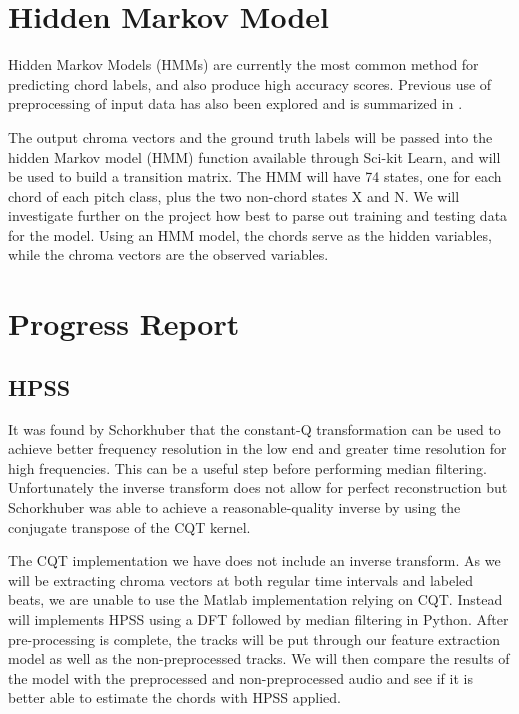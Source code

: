 \documentclass{article}
\begin{document}
\section{Hidden Markov Model}

Hidden Markov Models (HMMs) are currently the most common method for predicting
chord labels, and also produce high accuracy scores. Previous use of
preprocessing of input data has also been explored and is summarized in
\cite{McVicar:00}.

The output chroma vectors and the ground truth labels will be passed into the
hidden Markov model (HMM) function available through Sci-kit Learn, and will be used
to build a transition matrix. The HMM will have 74 states, one for each chord
of each pitch class, plus the two non-chord states X and N. We will investigate
further on the project how best to parse out training and testing data for the
model. Using an HMM model, the chords serve as the hidden variables, while the chroma 
vectors are the observed variables.

\section{Progress Report}\label{sec:progreport}

\subsection{HPSS}
It was found by Schorkhuber \cite{Schorkhuber:21} that the constant-Q
transformation can be used to achieve better frequency resolution in the low
end and greater time resolution for high frequencies. This can be a useful step
before performing median filtering. Unfortunately the inverse transform does
not allow for perfect reconstruction but Schorkhuber was able to achieve a
reasonable-quality inverse by using the conjugate transpose of the CQT kernel.

The CQT implementation we have does not include an inverse transform. As we
will be extracting chroma vectors at both regular time intervals and labeled beats, we
are unable to use the Matlab implementation relying on CQT.  Instead will
implements HPSS using a DFT followed by median filtering in Python. After
pre-processing is complete, the tracks will be put through our feature
extraction model as well as the non-preprocessed tracks. We will then compare the
results of the model with the preprocessed and non-preprocessed audio and see if
it is better able to estimate the chords with HPSS applied.
\end{document}
